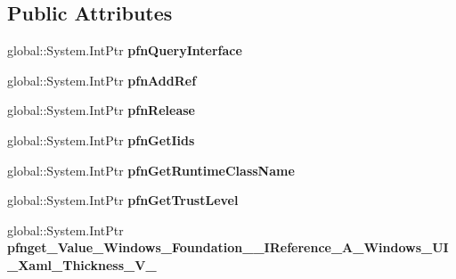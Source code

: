 \subsection*{Public Attributes}
\begin{DoxyCompactItemize}
\item 
\mbox{\label{struct_system_1_1_nullable___a___windows___u_i___xaml___thickness___v_______impl_1_1_vtbl_a2eea8b676e7ca5d4da45ab335c624189}} 
global\+::\+System.\+Int\+Ptr {\bfseries pfn\+Query\+Interface}
\item 
\mbox{\label{struct_system_1_1_nullable___a___windows___u_i___xaml___thickness___v_______impl_1_1_vtbl_a0bb509668f95bc3b24e5362d6b22bfce}} 
global\+::\+System.\+Int\+Ptr {\bfseries pfn\+Add\+Ref}
\item 
\mbox{\label{struct_system_1_1_nullable___a___windows___u_i___xaml___thickness___v_______impl_1_1_vtbl_abd12555d394b68ce2e1f36b790937284}} 
global\+::\+System.\+Int\+Ptr {\bfseries pfn\+Release}
\item 
\mbox{\label{struct_system_1_1_nullable___a___windows___u_i___xaml___thickness___v_______impl_1_1_vtbl_acbf018eba3511a62c07835c872fce194}} 
global\+::\+System.\+Int\+Ptr {\bfseries pfn\+Get\+Iids}
\item 
\mbox{\label{struct_system_1_1_nullable___a___windows___u_i___xaml___thickness___v_______impl_1_1_vtbl_a3cb1785241595cf444ee6a3508ba7f79}} 
global\+::\+System.\+Int\+Ptr {\bfseries pfn\+Get\+Runtime\+Class\+Name}
\item 
\mbox{\label{struct_system_1_1_nullable___a___windows___u_i___xaml___thickness___v_______impl_1_1_vtbl_a5d3b4b32ace825d4d3bcde072dec9100}} 
global\+::\+System.\+Int\+Ptr {\bfseries pfn\+Get\+Trust\+Level}
\item 
\mbox{\label{struct_system_1_1_nullable___a___windows___u_i___xaml___thickness___v_______impl_1_1_vtbl_a4a6aac954c3c3d16d43e5a1ed798b3cf}} 
global\+::\+System.\+Int\+Ptr {\bfseries pfnget\+\_\+\+Value\+\_\+\+Windows\+\_\+\+Foundation\+\_\+\+\_\+\+I\+Reference\+\_\+\+A\+\_\+\+Windows\+\_\+\+U\+I\+\_\+\+Xaml\+\_\+\+Thickness\+\_\+\+V\+\_\+}
\end{DoxyCompactItemize}
